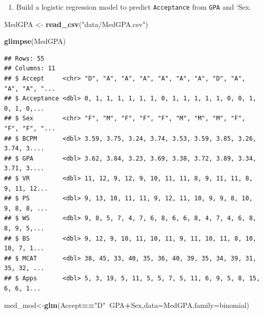 \documentclass[
]{book}
\newenvironment{Shaded}{\begin{snugshade}}{\end{snugshade}}
\newcommand{\DataTypeTok}[1]{\textcolor[rgb]{0.13,0.29,0.53}{#1}}
\newcommand{\KeywordTok}[1]{\textcolor[rgb]{0.13,0.29,0.53}{\textbf{#1}}}
\newcommand{\NormalTok}[1]{#1}
\newcommand{\OperatorTok}[1]{\textcolor[rgb]{0.81,0.36,0.00}{\textbf{#1}}}
\newcommand{\StringTok}[1]{\textcolor[rgb]{0.31,0.60,0.02}{#1}}
\providecommand{\tightlist}{%
  \setlength{\itemsep}{0pt}\setlength{\parskip}{0pt}}
\begin{document}
\begin{enumerate}
\def\labelenumi{\alph{enumi}.}
\tightlist
\item
  Build a logistic regression model to predict \texttt{Acceptance} from \texttt{GPA} and `Sex.
\end{enumerate}

\begin{Shaded}
\begin{Highlighting}[]
\NormalTok{MedGPA <-}\StringTok{ }\KeywordTok{read_csv}\NormalTok{(}\StringTok{"data/MedGPA.csv"}\NormalTok{)}
\end{Highlighting}
\end{Shaded}

\begin{Shaded}
\begin{Highlighting}[]
\KeywordTok{glimpse}\NormalTok{(MedGPA)}
\end{Highlighting}
\end{Shaded}

\begin{verbatim}
## Rows: 55
## Columns: 11
## $ Accept     <chr> "D", "A", "A", "A", "A", "A", "A", "D", "A", "A", "A", "...
## $ Acceptance <dbl> 0, 1, 1, 1, 1, 1, 1, 0, 1, 1, 1, 1, 1, 0, 0, 1, 0, 1, 0,...
## $ Sex        <chr> "F", "M", "F", "F", "F", "M", "M", "M", "F", "F", "F", "...
## $ BCPM       <dbl> 3.59, 3.75, 3.24, 3.74, 3.53, 3.59, 3.85, 3.26, 3.74, 3....
## $ GPA        <dbl> 3.62, 3.84, 3.23, 3.69, 3.38, 3.72, 3.89, 3.34, 3.71, 3....
## $ VR         <dbl> 11, 12, 9, 12, 9, 10, 11, 11, 8, 9, 11, 11, 8, 9, 11, 12...
## $ PS         <dbl> 9, 13, 10, 11, 11, 9, 12, 11, 10, 9, 9, 8, 10, 9, 8, 8, ...
## $ WS         <dbl> 9, 8, 5, 7, 4, 7, 6, 8, 6, 6, 8, 4, 7, 4, 6, 8, 8, 9, 5,...
## $ BS         <dbl> 9, 12, 9, 10, 11, 10, 11, 9, 11, 10, 11, 8, 10, 10, 7, 1...
## $ MCAT       <dbl> 38, 45, 33, 40, 35, 36, 40, 39, 35, 34, 39, 31, 35, 32, ...
## $ Apps       <dbl> 5, 3, 19, 5, 11, 5, 5, 7, 5, 11, 6, 9, 5, 8, 15, 6, 6, 1...
\end{verbatim}

\begin{Shaded}
\begin{Highlighting}[]
\NormalTok{med_mod<-}\KeywordTok{glm}\NormalTok{(Accept}\OperatorTok{==}\StringTok{"D"}\OperatorTok{~}\NormalTok{GPA}\OperatorTok{+}\NormalTok{Sex,}\DataTypeTok{data=}\NormalTok{MedGPA,}\DataTypeTok{family=}\NormalTok{binomial)}
\end{Highlighting}
\end{Shaded}
\end{document}
